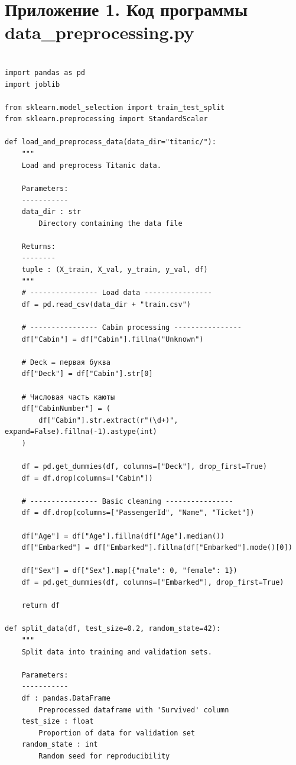 \documentclass[14pt,a4paper]{extarticle}
\begin{document}
\newpage
\section*{Приложение 1. Код программы data\_preprocessing.py}

\footnotesize
\setlength{\baselineskip}{0.25\baselineskip}

\begin{verbatim}

import pandas as pd
import joblib

from sklearn.model_selection import train_test_split
from sklearn.preprocessing import StandardScaler

def load_and_preprocess_data(data_dir="titanic/"):
    """
    Load and preprocess Titanic data.

    Parameters:
    -----------
    data_dir : str
        Directory containing the data file

    Returns:
    --------
    tuple : (X_train, X_val, y_train, y_val, df)
    """
    # ---------------- Load data ----------------
    df = pd.read_csv(data_dir + "train.csv")

    # ---------------- Cabin processing ----------------
    df["Cabin"] = df["Cabin"].fillna("Unknown")

    # Deck = первая буква
    df["Deck"] = df["Cabin"].str[0]

    # Числовая часть каюты
    df["CabinNumber"] = (
        df["Cabin"].str.extract(r"(\d+)", expand=False).fillna(-1).astype(int)
    )

    df = pd.get_dummies(df, columns=["Deck"], drop_first=True)
    df = df.drop(columns=["Cabin"])

    # ---------------- Basic cleaning ----------------
    df = df.drop(columns=["PassengerId", "Name", "Ticket"])

    df["Age"] = df["Age"].fillna(df["Age"].median())
    df["Embarked"] = df["Embarked"].fillna(df["Embarked"].mode()[0])

    df["Sex"] = df["Sex"].map({"male": 0, "female": 1})
    df = pd.get_dummies(df, columns=["Embarked"], drop_first=True)

    return df

def split_data(df, test_size=0.2, random_state=42):
    """
    Split data into training and validation sets.

    Parameters:
    -----------
    df : pandas.DataFrame
        Preprocessed dataframe with 'Survived' column
    test_size : float
        Proportion of data for validation set
    random_state : int
        Random seed for reproducibility


\end{verbatim}
\end{document}
